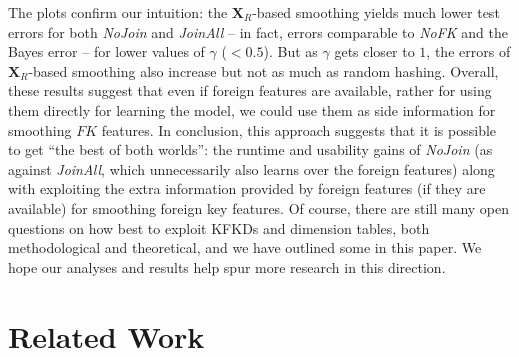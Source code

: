\documentclass{vldb}
\begin{document}
The plots confirm our intuition: the $\textbf{X}_R$-based smoothing yields much lower test errors for both \textit{NoJoin} and \textit{JoinAll} -- in 
fact, errors comparable to \textit{NoFK} and the Bayes error -- for lower values of $\gamma$ ($<0.5$). But as $\gamma$ gets closer to $1$, the 
errors of $\textbf{X}_R$-based smoothing also increase but not as much as random hashing. Overall, these results suggest that even if foreign features 
are available, rather for using them directly for learning the model, we could use them as side information for smoothing $FK$ features. In conclusion,
this approach suggests that it is possible to get ``the best of both worlds'': the runtime and usability gains of \textit{NoJoin} (as against \textit{JoinAll}, 
which unnecessarily also learns over the foreign features) along with exploiting the extra information provided by foreign features (if they are available)
for smoothing foreign key features. Of course, there are still many open questions on how best to exploit KFKDs and dimension tables, both methodological
and theoretical, and we have outlined some in this paper. We hope our analyses and results help spur more research in this direction.


\section{Related Work}

\end{document}
